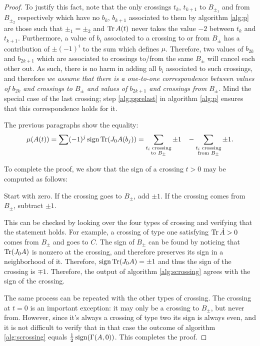 \begin{proof}
To justify this fact, note that the only crossings $t_k$, $t_{k+1}$ to $B_{\pm_1}$ and from $B_{\pm_2}$ respectively which have no $b_k$, $b_{k+1}$ associated to them by algorithm \ref{alg:p} are those such that $\pm_1 = \pm_2$ and $\operatorname{Tr} A(t)$ never takes the value $-2$ between $t_k$ and $t_{k+1}$. Furthermore, a value of $b_i$ associated to a crossing to or from $B_\pm$ has a contribution of $\pm (-1)^i$ to the sum which defines $\mu$. Therefore, two values of $b_{2k}$ and $b_{2k+1}$ which are associated to crossings to/from the same $B_\pm$ will cancel each other out. As such, there is no harm in adding all $b_i$ associated to such crossings, and therefore \emph{we assume that there is a one-to-one correspondence between values of $b_{2k}$ and crossings to $B_\pm$ and values of $b_{2k+1}$ and crossings from $B_\pm$}. Mind the special case of the last crossing; step \ref{alg:pprelast} in algorithm \ref{alg:p} ensures that this correspondence holds for it.

The previous paragraphs show the equality:
\begin{equation}
\mu(A(t)) = \sum (-1)^j \operatorname{sign} \operatorname{Tr}(J_0 A(b_j)) = \sum_{\substack{t_i \text{ crossing}\\\text{to } B_\pm}} \pm 1 \;\;\;- \sum_{\substack{t_i \text{ crossing}\\\text{from } B_\pm}} \pm 1.
\end{equation}

To complete the proof, we show that the sign of a crossing $t > 0$ may be computed as follows:
\begin{algorithm}\label{alg:scrossing}
Start with zero. If the crossing goes to $B_\pm$, add $\pm 1$. If the crossing comes from $B_\pm$, subtract $\pm 1$.
\end{algorithm}

This can be checked by looking over the four types of crossing and verifying that the statement holds. For example, a crossing of type one satisfying $\operatorname{Tr} \dot A > 0$ comes from $B_\pm$ and goes to $C$. The sign of $B_\pm$ can be found by noticing that $\operatorname{Tr}(J_0 A)$ is nonzero at the crossing, and therefore preserves its sign in a neighborhood of it. Therefore, $\operatorname{sign} \operatorname{Tr}(J_0 A) = \pm 1$ and thus the sign of the crossing is $\mp 1$. Therefore, the output of algorithm \ref{alg:scrossing} agrees with the sign of the crossing.

The same process can be repeated with the other types of crossing. The crossing at $t = 0$ is an important exception: it may only be a crossing to $B_\pm$, but never from. However, since it's always a crossing of type two its sign is always even, and it is not difficult to verify that in that case the outcome of algorithm \ref{alg:scrossing} equals $\frac12 \operatorname{sign}(\Gamma(A,0))$. This completes the proof.
\end{proof}